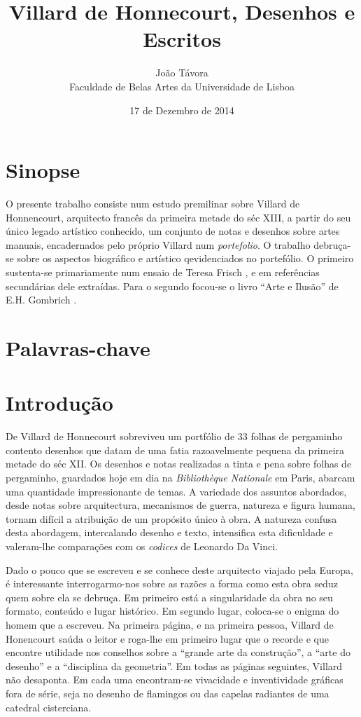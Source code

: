 \documentclass{article}
\title{Villard de Honnecourt, Desenhos e Escritos}
\date{17 de Dezembro de 2014}
\author{João Távora \\Faculdade de Belas Artes da Universidade de Lisboa}
\begin{document}
\maketitle

\section{Sinopse}

O presente trabalho consiste num estudo premilinar sobre Villard de
Honnencourt, arquitecto francês da primeira metade do séc XIII, a
partir do seu único legado artístico conhecido, um conjunto de notas e
desenhos sobre artes manuais, encadernados pelo próprio Villard num
\emph{portefolio}. O trabalho debruça-se sobre os aspectos biográfico
e artístico qevidenciados no portefólio. O primeiro sustenta-se
primariamente num ensaio de Teresa Frisch \cite{teresa}, e em
referências secundárias dele extraídas. Para o segundo focou-se o
livro ``Arte e Ilusão'' de E.H. Gombrich \cite{gombrich}.

\section{Palavras-chave}

\section{Introdução}

De Villard de Honnecourt sobreviveu um portfólio de 33 folhas de
pergaminho contento desenhos que datam de uma fatia razoavelmente
pequena da primeira metade do séc XII. Os desenhos e notas realizadas
a tinta e pena sobre folhas de pergaminho, guardados hoje em dia na
\emph{Bibliothèque Nationale} em Paris, abarcam uma quantidade
impressionante de temas. A variedade dos assuntos abordados, desde
notas sobre arquitectura, mecanismos de guerra, natureza e figura
humana, tornam difícil a atribuição de um propósito único à obra. A
natureza confusa desta abordagem, intercalando desenho e texto,
intensifica esta dificuldade e valeram-lhe comparações com os
\emph{codices} de Leonardo Da Vinci.

Dado o pouco que se escreveu e se conhece deste arquitecto viajado
pela Europa, é interessante interrogarmo-nos sobre as razões a forma
como esta obra seduz quem sobre ela se debruça. Em primeiro está a
singularidade da obra no seu formato, conteúdo e lugar histórico. Em
segundo lugar, coloca-se o enigma do homem que a escreveu. Na primeira
página, e na primeira pessoa, Villard de Honencourt saúda o leitor e
roga-lhe em primeiro lugar que o recorde e que encontre utilidade nos
conselhos sobre a ``grande arte da construção'', a ``arte do desenho''
e a ``disciplina da geometria''. Em todas as páginas seguintes,
Villard não desaponta. Em cada uma encontram-se vivacidade e
inventividade gráficas fora de série, seja no desenho de flamingos ou
das capelas radiantes de uma catedral cisterciana.
\end{document}
